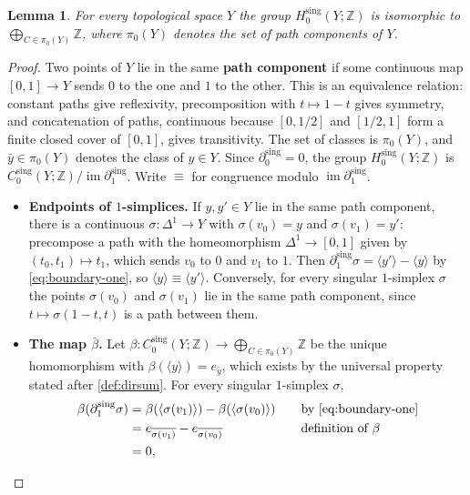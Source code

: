 \documentclass{extracta-temp-26}
\numberwithin{equation}{section}
\newtheorem{lem}[teo]{Lemma}
\theoremstyle{definition}
\theoremstyle{remark}
\newcommand{\Z}{\mathbb{Z}}
\newcommand{\Hsing}{H^{\mathrm{sing}}}
\newcommand{\Csing}{C^{\mathrm{sing}}}
\newcommand{\dsing}{\partial^{\mathrm{sing}}}
\newcommand{\gen}[1]{\langle #1\rangle}
\DeclareMathOperator{\im}{im}
\newcommand{\term}[1]{\textbf{#1}}
\newcommand{\step}[1]{\textbf{#1}}
\begin{document}
\begin{lem}\label{lem:H0}
For every topological space \(Y\) the group \(\Hsing_0(Y;\Z)\) is isomorphic to \(\bigoplus_{C\in\pi_0(Y)}\Z\), where \(\pi_0(Y)\) denotes the set of path components of \(Y\).
\end{lem}

\begin{proof}
Two points of \(Y\) lie in the same \term{path component} if some continuous map \([0,1]\to Y\) sends \(0\) to the one and \(1\) to the other.
This is an equivalence relation: constant paths give reflexivity, precomposition with \(t\mapsto 1-t\) gives symmetry, and concatenation of paths, continuous because \([0,1/2]\) and \([1/2,1]\) form a finite closed cover of \([0,1]\), gives transitivity.
The set of classes is \(\pi_0(Y)\), and \(\bar y\in\pi_0(Y)\) denotes the class of \(y\in Y\).
Since \(\dsing_0=0\), the group \(\Hsing_0(Y;\Z)\) is \(\Csing_0(Y;\Z)/\im\dsing_1\).
Write \(\equiv\) for congruence modulo \(\im\dsing_1\).
\begin{itemize}
\item \step{Endpoints of \(1\)-simplices.}
If \(y,y'\in Y\) lie in the same path component, there is a continuous \(\sigma\colon\Delta^1\to Y\) with \(\sigma(v_0)=y\) and \(\sigma(v_1)=y'\): precompose a path with the homeomorphism \(\Delta^1\to[0,1]\) given by \((t_0,t_1)\mapsto t_1\), which sends \(v_0\) to \(0\) and \(v_1\) to \(1\).
Then \(\dsing_1\sigma=\gen{y'}-\gen{y}\) by \eqref{eq:boundary-one}, so \(\gen{y}\equiv\gen{y'}\).
Conversely, for every singular \(1\)-simplex \(\sigma\) the points \(\sigma(v_0)\) and \(\sigma(v_1)\) lie in the same path component, since \(t\mapsto\sigma(1-t,t)\) is a path between them.
\item \step{The map \(\bar\beta\).}
Let \(\beta\colon\Csing_0(Y;\Z)\to\bigoplus_{C\in\pi_0(Y)}\Z\) be the unique homomorphism with \(\beta(\gen{y})=e_{\bar y}\), which exists by the universal property stated after \cref{def:dirsum}.
For every singular \(1\)-simplex \(\sigma\),
\begin{equation}\label{eq:beta-boundary}
\begin{aligned}
\beta(\dsing_1\sigma)
&=\beta(\gen{\sigma(v_1)})-\beta(\gen{\sigma(v_0)})&&\quad\text{by \eqref{eq:boundary-one}}\\
&=e_{\overline{\sigma(v_1)}}-e_{\overline{\sigma(v_0)}}&&\quad\text{definition of \(\beta\)}\\
&=0,
\end{aligned}
\end{equation}

\end{itemize}
\end{proof}
\end{document}
